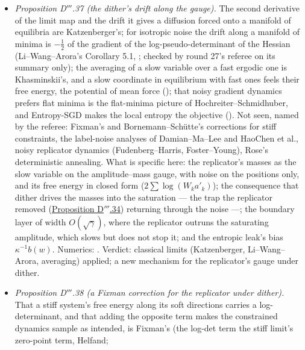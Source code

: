 \begin{itemize}
    into the saturation, where the limit map's derivative degenerates; and the entropic leak on the masses as a leak
    on the unexcited subspace, which pins the gauge without bias where the particle fractions are representable.
    Numerics: . Verdict: a classical limit theorem applied; the replicator's unpinned masses
    under dither, and their remedy.
  \item \emph{Proposition D$'''$.37 (the dither's drift along the gauge).} The second
    derivative of the limit map and the drift it gives a diffusion forced onto a manifold of equilibria are
    Katzenberger's; for isotropic noise the drift along a manifold of minima is $-\frac12$ of the gradient of the
    log-pseudo-determinant of the Hessian (Li--Wang--Arora's Corollary 5.1, \cite{S64}; checked by round 27's referee
    on its summary only); the averaging of a slow variable over a fast ergodic one is Khasminskii's, and a slow
    coordinate in equilibrium with fast ones feels their free energy, the potential of mean force (\cite{S65}); that
    noisy gradient dynamics prefers flat minima is the flat-minima picture of Hochreiter--Schmidhuber, and Entropy-SGD
    makes the local entropy the objective (\cite{S65}). Not seen, named by the referee: Fixman's and
    Bornemann--Sch\"utte's corrections for stiff constraints, the label-noise analyses of Damian--Ma--Lee and HaoChen
    et al., noisy replicator dynamics (Fudenberg--Harris, Foster--Young), Rose's deterministic annealing. What is
    specific here: the replicator's masses as the slow variable on the amplitude--mass gauge, with noise on the
    positions only, and its free energy in closed form ($2\sum\log(W_ka'_k)$); the consequence that dither drives the
    masses into the saturation --- the trap the replicator removed (\hyperref[res:thmDppp:34]{Proposition D$'''$.34})
    returning through the noise ---; the boundary layer of width $O(\sqrt\gamma)$, where the replicator outruns the
    saturating amplitude, which slows but does not stop it; and the entropic leak's bias $\kappa^{-1}b(w)$. Numerics:
    . Verdict: classical limits (Katzenberger, Li--Wang--Arora, averaging) applied; a new
    mechanism for the replicator's gauge under dither.
  \item \emph{Proposition D$'''$.38 (a Fixman correction for the replicator under dither).} That a stiff system's free
    energy along its soft directions carries a log-determinant, and that adding the opposite term makes the
    constrained dynamics sample as intended, is Fixman's (the log-det term the stiff limit's zero-point term, Helfand;

\end{itemize}

